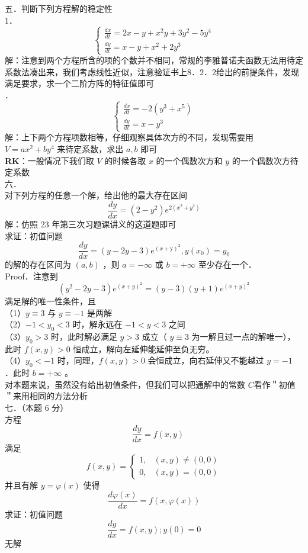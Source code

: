 \documentclass[UTF8]{ctexart}
\begin{document}
\noindent 五．判断下列方程解的稳定性\\
1．
\[
\left\{
\begin{array}{l}
	\displaystyle\frac{dx}{dt} =2x-y+x^2y+3y^2-5y^4\\ 
	\displaystyle\frac{dy}{dt} = x-y+x^2+2y^3
\end{array}
\right.
\]
解：注意到两个方程所含的项的个数并不相同，常规的李雅普诺夫函数无法用待定系数法凑出来，我们考虑线性近似，注意验证书上8．2．2给出的前提条件，发现满足要求，求一个二阶方阵的特征值即可\\


．
\[
\left\{
\begin{array}{l}
	\displaystyle\frac{dx}{dt} =-2\left(y^3+x^5 \right) \\ 
	\displaystyle\frac{dy}{dt} = x-y^3
\end{array}
\right.
\]
解：上下两个方程项数相等，仔细观察具体次方的不同，发现需要用 $V=a x^{2}+b y^{4}$ 来待定系数，求出 $a, b$ 即可\\
\textbf{RK}：一般情况下我们取 $V$ 的时候各取 $x$ 的一个偶数次方和 $y$ 的一个偶数次方待定系数\\


\noindent 六．\\
对下列方程的任意一个解，给出他的最大存在区间
$$
\frac{d y}{d x}=\left(2-y^{2}\right) e^{2\left(x^{2}+y^{2}\right)}
$$
解：仿照 23 年第三次习题课讲义的这道题即可\\
求证：初值问题
$$
\frac{d y}{d x}=(y-2 y-3) e^{(x+\mathrm{y})^{2}}, y\left(x_{0}\right)=y_{0}
$$
的解的存在区间为 $(a, b)$ ，则 $a=-\infty$ 或 $b=+\infty$ 至少存在一个．\\
Proof．注意到
$$
\left(y^{2}-2 y-3\right) e^{(x+y)^{2}}=(y-3)(y+1) e^{(x+y)^{2}}
$$
满足解的唯一性条件，且\\
（1）$y\equiv 3$ 与 $y \equiv -1$ 是两解\\
（2）$-1<y_{0}<3$ 时，解永远在 $-1<y<3$ 之间\\
（3）$y_{0}>3$ 时，此时解必满足 $y>3$ 成立（ $y \equiv 3$ 为一解且过一点的解唯一），此时 $f(x, y)>0$ 恒成立，解向左延伸能延伸至负无穷。\\
（4）$y_{0}<-1$ 时，同理，$f(x, y)>0$ 会恒成立，向右延伸又不能越过 $y=-1$ ．此时 $b=+\infty$ 。\\
对本题来说，虽然没有给出初值条件，但我们可以把通解中的常数 $C$看作＂初值＂来用相同的方法分析\\



\noindent 七．（本题 6 分）\\
方程 $$\quad \frac{d y}{d x}=f(x, y)$$
满足
$$
f(x, y)= \begin{cases}1, & (x, y) \neq(0,0) \\ 0, & (x, y)=(0,0)\end{cases}
$$
并且有解 $y=\varphi(x)$ 使得 $$\frac{d \varphi(x)}{d x}=f(x, \varphi(x))$$
求证：初值问题 $$\frac{d y}{d x}=f(x, y) ; y(0)=0$$
无解
\end{document}
